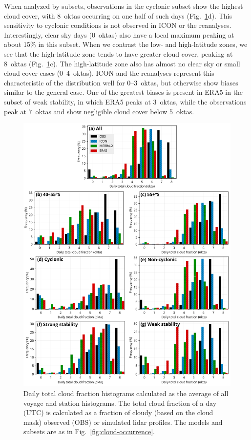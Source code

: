 \documentclass[draft]{agujournal2019}
\begin{document}
When analyzed by subsets, observations in the cyclonic subset show the highest cloud cover, with 8~oktas occurring on one half of such days (Fig.~\ref{fig:cloud-cover}d). This sensitivity to cyclonic conditions is not observed in ICON or the reanalyses. Interestingly, clear sky days (0~oktas) also have a local maximum peaking at about 15\% in this subset. When we contrast the low- and high-latitude zones, we see that the high-latitude zone tends to have greater cloud cover, peaking at 8~oktas (Fig.~\ref{fig:cloud-cover}c). The high-latitude zone also has almost no clear sky or small cloud cover cases (0--4~oktas). ICON and the reanalyses represent this characteristic of the distribution well for 0--3~oktas, but otherwise show biases similar to the general case. One of the greatest biases is present in ERA5 in the subset of weak stability, in which ERA5 peaks at 3~oktas, while the observations peak at 7~oktas and show negligible cloud cover below 5~oktas.

\begin{figure}[p!]
\centering
\includegraphics[width=\textwidth]{img/clt_hist.pdf}
\caption{
Daily total cloud fraction histograms calculated as the average of all voyage and station histograms. The total cloud fraction of a day (UTC) is calculated as a fraction of cloudy (based on the cloud mask) observed (OBS) or simulated lidar profiles. The models and subsets are as in Fig.~\ref{fig:cloud-occurrence}.
}
\label{fig:cloud-cover}
\end{figure}
\end{document}
